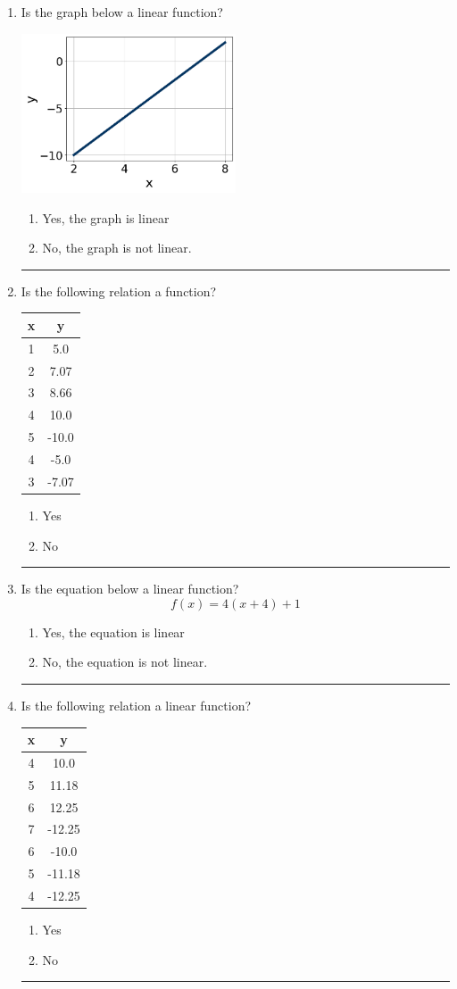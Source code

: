\documentclass[14pt]{extbook}
\newcommand{\litem}[1]{\item#1\hspace*{-1cm}\rule{\textwidth}{0.4pt}}
\begin{document}
\begin{enumerate}
{\begin{enumerate}[label=\Alph*.]
\end{enumerate} }
\litem{
Is the graph below a linear function?
\begin{center}
    \includegraphics[width=0.5\textwidth]{../Figures/MA_8_F_1_2_graphN.png}
\end{center}
\begin{enumerate}[label=\Alph*.]
\item Yes, the graph is linear
\item No, the graph is not linear.

\end{enumerate} }
\litem{
Is the following relation a function?

\begin{tabular}{c|c}
x &y\tabularnewline \hline
1 &5.0\tabularnewline \hline
2 &7.07\tabularnewline \hline
3 &8.66\tabularnewline \hline
4 &10.0\tabularnewline \hline
5 &-10.0\tabularnewline \hline
4 &-5.0\tabularnewline \hline
3 &-7.07\end{tabular}\begin{enumerate}[label=\Alph*.]
\item Yes
\item No

\end{enumerate} }
\litem{
Is the equation below a linear function?\[ f(x) = 4(x + 4)+1 \]\begin{enumerate}[label=\Alph*.]
\item Yes, the equation is linear
\item No, the equation is not linear.

\end{enumerate} }
\litem{
Is the following relation a linear function?

\begin{tabular}{c|c}
x &y\tabularnewline \hline
4 &10.0\tabularnewline \hline
5 &11.18\tabularnewline \hline
6 &12.25\tabularnewline \hline
7 &-12.25\tabularnewline \hline
6 &-10.0\tabularnewline \hline
5 &-11.18\tabularnewline \hline
4 &-12.25\end{tabular}\begin{enumerate}[label=\Alph*.]
\item Yes
\item No


\end{enumerate}}
\end{enumerate}
\end{document}
